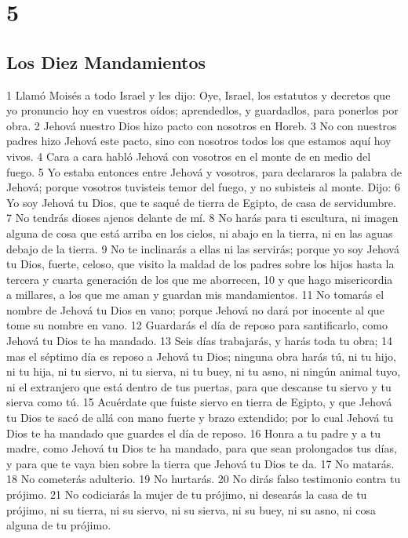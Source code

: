 \chapter{5}


\section{Los Diez Mandamientos }


1 Llamó Moisés a todo Israel y les dijo: Oye, Israel, los estatutos y decretos que yo pronuncio hoy en vuestros oídos; aprendedlos, y guardadlos, para ponerlos por obra.
2 Jehová nuestro Dios hizo pacto con nosotros en Horeb.
3 No con nuestros padres hizo Jehová este pacto, sino con nosotros todos los que estamos aquí hoy vivos.
4 Cara a cara habló Jehová con vosotros en el monte de en medio del fuego.
5 Yo estaba entonces entre Jehová y vosotros, para declararos la palabra de Jehová; porque vosotros tuvisteis temor del fuego, y no subisteis al monte. Dijo:
6 Yo soy Jehová tu Dios, que te saqué de tierra de Egipto, de casa de servidumbre.
7 No tendrás dioses ajenos delante de mí.
8 No harás para ti escultura, ni imagen alguna de cosa que está arriba en los cielos, ni abajo en la tierra, ni en las aguas debajo de la tierra.
9 No te inclinarás a ellas ni las servirás; porque yo soy Jehová tu Dios, fuerte, celoso, que visito la maldad de los padres sobre los hijos hasta la tercera y cuarta generación de los que me aborrecen,
10 y que hago misericordia a millares, a los que me aman y guardan mis mandamientos.
11 No tomarás el nombre de Jehová tu Dios en vano; porque Jehová no dará por inocente al que tome su nombre en vano.
12 Guardarás el día de reposo para santificarlo, como Jehová tu Dios te ha mandado. 
13 Seis días trabajarás, y harás toda tu obra;
14 mas el séptimo día es reposo a Jehová tu Dios; ninguna obra harás tú, ni tu hijo, ni tu hija, ni tu siervo, ni tu sierva, ni tu buey, ni tu asno, ni ningún animal tuyo, ni el extranjero que está dentro de tus puertas, para que descanse tu siervo y tu sierva como tú.
15 Acuérdate que fuiste siervo en tierra de Egipto, y que Jehová tu Dios te sacó de allá con mano fuerte y brazo extendido; por lo cual Jehová tu Dios te ha mandado que guardes el día de reposo.
16 Honra a tu padre y a tu madre, como Jehová tu Dios te ha mandado, para que sean prolongados tus días, y para que te vaya bien sobre la tierra que Jehová tu Dios te da.
17 No matarás. 
18 No cometerás adulterio.
19 No hurtarás. 
20 No dirás falso testimonio contra tu prójimo.
21 No codiciarás la mujer de tu prójimo, ni desearás la casa de tu prójimo, ni su tierra, ni su siervo, ni su sierva, ni su buey, ni su asno, ni cosa alguna de tu prójimo.

